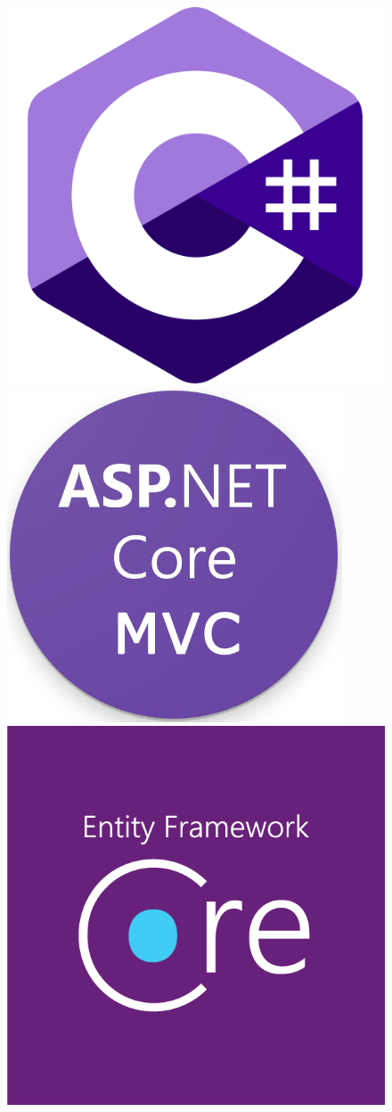 \documentclass[10pt]{beamer}
\begin{document}
\begin{frame}
	\begin{figure}
		\centering
		\begin{minipage}{.30\linewidth}
			\centering
			\includegraphics[width=0.5\linewidth]{./images/c_sharp.png}
		\end{minipage}\hfill
		\begin{minipage}{.30\linewidth}
			\centering
			\includegraphics[width=0.5\linewidth]{./images/asp_net_core_mvc.png}
		\end{minipage}\hfill
		\begin{minipage}{.30\linewidth}
			\centering
			\includegraphics[width=0.5\linewidth]{./images/ef_core.png}
		\end{minipage}
	\end{figure}
\end{frame}
\end{document}
